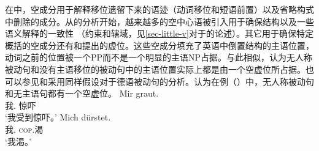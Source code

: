 在\gbtc 中，空成分用于解释移位遗留下来的语迹（动词移位和短语前置）以及省略构式中删除的成分。从\citet{Larson88a}的分析开始，越来越多的空中心语被引入用于确保结构以及一些语义解释的一致性 （约束和辖域，见\ref{sec-little-v}对于\littlevc 的论述）。其它用于确保特定概括的空成分还有\citet[]{Coopmans-89a-u}和\citet[Chapter~1]{Postal2004a-u}提出的虚位。这些空成分填充了英语中倒置结构的主语位置，动词之前的位置被一个PP而不是一个明显的主语NP占据。与此相似，\citet[]{Grewendorf93}认为无人称被动句和没有主语移位的被动句中的主语位置实际上都是由一个空虚位所占据。也可以参见和\citet[]{Lohnstein2014a}采用同样假设对于德语被动句的分析。\citet[\S~II.3.3.3]{Sternefeld2006a-u}认为在例（）中，无人称被动句和无主语句都有一个空虚位。
\eal
\ex 
\gll Mir graut.\\
	 我.\dat{} 惊吓\\
\glt `我受到惊吓。'
\ex 
\gll Mich dürstet.\\
	我.\acc{} \textsc{cop}.渴\\
\glt `我渴。'
\zl

